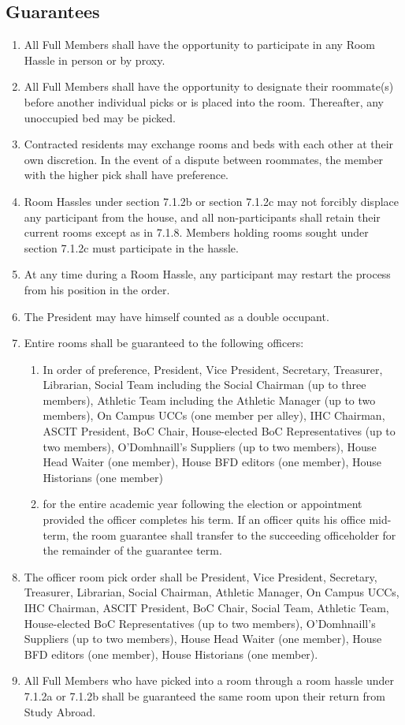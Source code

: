 \documentclass[10pt]{article} %
\begin{document}
\subsection{Guarantees}
\begin{enumerate}
\item All Full Members shall have the opportunity to participate in any Room Hassle in person or by proxy.
\item All Full Members shall have the opportunity to designate their roommate(s) before another individual picks or is placed into the room. Thereafter, any unoccupied bed may be picked.
\item Contracted residents may exchange rooms and beds with each other at their own discretion. In the event of a dispute between roommates, the member with the higher pick shall have preference.
\item Room Hassles under section 7.1.2b or section 7.1.2c may not forcibly displace any participant from the house, and all non-participants shall retain their current rooms except as in 7.1.8. Members holding rooms sought under section 7.1.2c must participate in the hassle.
\item At any time during a Room Hassle, any participant may restart the process from his position in the order.
\item The President may have himself counted as a double occupant.
\item Entire rooms shall be guaranteed to the following officers:
\begin{enumerate}
\item In order of preference, President, Vice President, Secretary, Treasurer, Librarian, Social Team including the Social Chairman (up to three members), Athletic Team including the Athletic Manager (up to two members), On Campus UCCs (one member per alley), IHC Chairman, ASCIT President, BoC Chair, House-elected BoC Representatives (up to two members), O’Domhnaill’s Suppliers (up to two members), House Head Waiter (one member), House BFD editors (one member), House Historians (one member)
\item for the entire academic year following the election or appointment provided the officer completes his term. If an officer quits his office mid-term, the room guarantee shall transfer to the succeeding officeholder for the remainder of the guarantee term.
\end{enumerate}
\item The officer room pick order shall be President, Vice President, Secretary, Treasurer, Librarian, Social Chairman, Athletic Manager, On Campus UCCs, IHC Chairman, ASCIT President, BoC Chair, Social Team, Athletic Team, House-elected BoC Representatives (up to two members), O’Domhnaill’s Suppliers (up to two members), House Head Waiter (one member), House BFD editors (one member), House Historians (one member).
\item All Full Members who have picked into a room through a room hassle under 7.1.2a or 7.1.2b shall be guaranteed the same room upon their return from Study Abroad.
\end{enumerate}
\end{document}
